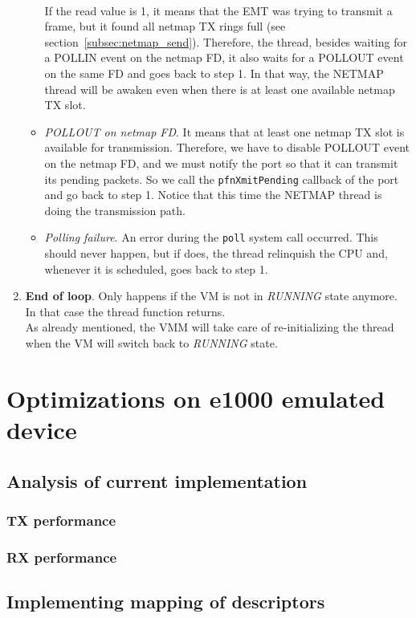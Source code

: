 \documentclass[a4paper, 12pt, titlepage]{report}
\begin{document}
\begin{enumerate}
\begin{itemize}
	\\
	If the read value is 1, it means that the EMT was trying to transmit a frame, but it found all netmap TX rings full (see section~\ref{subsec:netmap_send}). Therefore, the thread, besides waiting for a POLLIN event on the netmap FD, it also waits for a POLLOUT event on the same FD and goes back to step 1. In that way, the NETMAP thread will be awaken even when there is at least one available netmap TX slot.
	\item \textit{POLLOUT on netmap FD}. It means that at least one netmap TX slot is available for transmission. Therefore, we have to disable POLLOUT event on the netmap FD, and we must notify the port so that it can transmit its pending packets. So we call the \texttt{pfnXmitPending} callback of the port and go back to step 1. Notice that this time the NETMAP thread is doing the transmission path.
	\item \textit{Polling failure}. An error during the \texttt{poll} system call occurred. This should never happen, but if does, the thread relinquish the CPU and, whenever it is scheduled, goes back to step 1. 
	\end{itemize}
\item \textbf{End of loop}. Only happens if the VM is not in \textit{RUNNING} state anymore. In that case the thread function returns.
\\
As already mentioned, the VMM will take care of re-initializing the thread when the VM will switch back to \textit{RUNNING} state.
\end{enumerate}
\chapter{Optimizations on e1000 emulated device}
\section{Analysis of current implementation}
\subsection{TX performance}
\subsection{RX performance}
\section{Implementing mapping of descriptors} \label{subsec:memmap}
\end{document}
